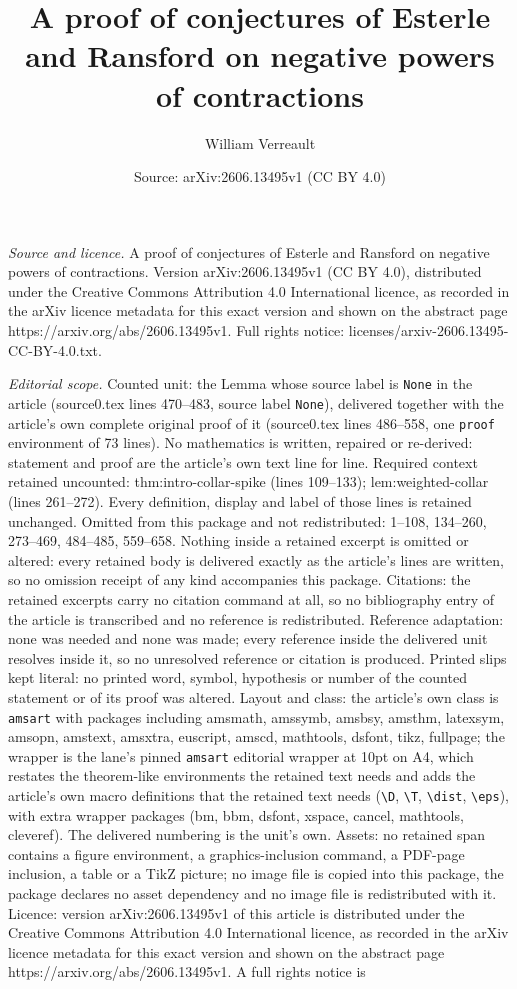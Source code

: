 \documentclass[10pt,a4paper]{amsart}
\title[A proof of conjectures of Esterle and Ransford on negative p]{A proof of conjectures of Esterle and Ransford on negative powers of contractions}
\author{William Verreault}
\date{Source: arXiv:2606.13495v1 (CC BY 4.0)}
\begin{document}
\maketitle

\noindent\emph{Source and licence.} A proof of conjectures of Esterle and Ransford on negative powers of contractions. Version arXiv:2606.13495v1 (CC BY 4.0), distributed under the Creative Commons Attribution 4.0 International licence, as recorded in the arXiv licence metadata for this exact version and shown on the abstract page https://arxiv.org/abs/2606.13495v1. Full rights notice: licenses/arxiv-2606.13495-CC-BY-4.0.txt.\par\smallskip

\noindent\textit{Editorial scope.} Counted unit: the Lemma whose source label is \texttt{None} in the article (source0.tex lines 470--483, source label \texttt{None}), delivered together with the article's own complete original proof of it (source0.tex lines 486--558, one \texttt{proof} environment of 73 lines). No mathematics is written, repaired or re-derived: statement and proof are the article's own text line for line. Required context retained uncounted: thm:intro-collar-spike (lines 109--133); lem:weighted-collar (lines 261--272). Every definition, display and label of those lines is retained unchanged. Omitted from this package and not redistributed: 1--108, 134--260, 273--469, 484--485, 559--658. Nothing inside a retained excerpt is omitted or altered: every retained body is delivered exactly as the article's lines are written, so no omission receipt of any kind accompanies this package. Citations: the retained excerpts carry no citation command at all, so no bibliography entry of the article is transcribed and no reference is redistributed. Reference adaptation: none was needed and none was made; every reference inside the delivered unit resolves inside it, so no unresolved reference or citation is produced. Printed slips kept literal: no printed word, symbol, hypothesis or number of the counted statement or of its proof was altered. Layout and class: the article's own class is \texttt{amsart} with packages including amsmath, amssymb, amsbsy, amsthm, latexsym, amsopn, amstext, amsxtra, euscript, amscd, mathtools, dsfont, tikz, fullpage; the wrapper is the lane's pinned \texttt{amsart} editorial wrapper at 10pt on A4, which restates the theorem-like environments the retained text needs and adds the article's own macro definitions that the retained text needs (\texttt{\textbackslash D}, \texttt{\textbackslash T}, \texttt{\textbackslash dist}, \texttt{\textbackslash eps}), with extra wrapper packages (bm, bbm, dsfont, xspace, cancel, mathtools, cleveref). The delivered numbering is the unit's own. Assets: no retained span contains a figure environment, a graphics-inclusion command, a PDF-page inclusion, a table or a TikZ picture; no image file is copied into this package, the package declares no asset dependency and no image file is redistributed with it. Licence: version arXiv:2606.13495v1 of this article is distributed under the Creative Commons Attribution 4.0 International licence, as recorded in the arXiv licence metadata for this exact version and shown on the abstract page https://arxiv.org/abs/2606.13495v1. A full rights notice is 
\end{document}
